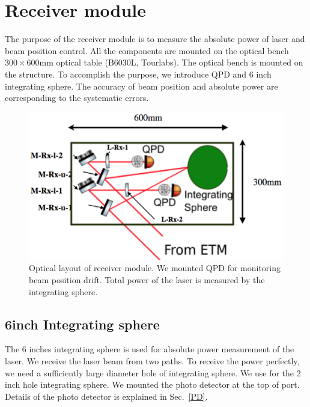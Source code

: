\section{Receiver module}
The purpose of the receiver module is to measure the absolute power of laser and beam position control.
All the components are mounted on the optical bench $300 \times 600 \mathrm{mm}$ optical table (B6030L, Tourlabs). 
The optical bench is mounted on the structure.
To accomplish the purpose, we introduce QPD and  6 inch integrating sphere.
The accuracy of beam position and absolute power are corresponding to the systematic errors. 
\begin{figure}
\begin{center}
\includegraphics[width=14cm]{Figures/Rx_module_layout.eps}
\caption{Optical layout of receiver module. We mounted QPD for monitoring beam position drift. Total power of the laser is measured by the integrating sphere.} 
\label{fig:Rx_module_layout} 
\end{center}
\end{figure}
\subsection{6inch Integrating sphere}
The 6 inches integrating sphere is used for absolute power measurement of the laser. We receive the laser beam from two paths. To receive the power perfectly, we need a sufficiently large diameter hole of integrating sphere. We use for the 2 inch hole integrating sphere. We mounted the photo detector at the top of port. Details of the photo detector is explained in Sec.~\ref{PD}.

